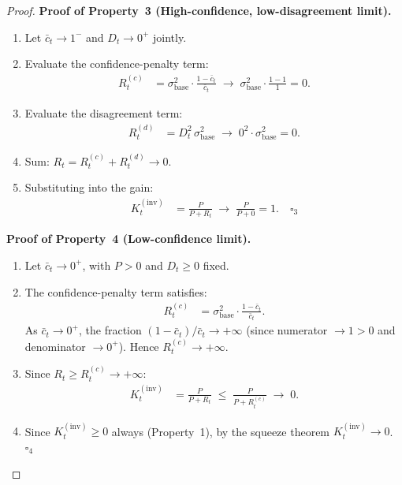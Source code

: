 \documentclass[12pt,openany]{book}
\numberwithin{equation}{chapter}
\theoremstyle{plain}
\theoremstyle{definition}
\theoremstyle{remark}
\begin{document}
\begin{proof}
\medskip
\noindent\textbf{Proof of Property~3
(High-confidence, low-disagreement limit).}
\begin{enumerate}
  \item Let $\bar{c}_t \to 1^{-}$ and $D_t \to 0^{+}$
        jointly.
  \item Evaluate the confidence-penalty term:
        \begin{align}
          R_t^{(c)}
          &= \sigma_{\mathrm{base}}^2 \cdot
             \frac{1 - \bar{c}_t}{\bar{c}_t}
          \;\to\;
          \sigma_{\mathrm{base}}^2 \cdot
          \frac{1 - 1}{1}
          = 0.
          \label{eq:proof3-Rc}
        \end{align}
  \item Evaluate the disagreement term:
        \begin{align}
          R_t^{(d)}
          &= D_t^2\,\sigma_{\mathrm{base}}^2
          \;\to\;
          0^2 \cdot \sigma_{\mathrm{base}}^2
          = 0.
          \label{eq:proof3-Rd}
        \end{align}
  \item Sum: $R_t = R_t^{(c)} + R_t^{(d)} \to 0$.
  \item Substituting into the gain:
        \begin{align}
          K_t^{(\mathrm{inv})}
          &= \frac{P}{P + R_t}
          \;\to\;
          \frac{P}{P + 0}
          = 1. \quad \square_3
          \label{eq:proof3-K}
        \end{align}
\end{enumerate}

\medskip
\noindent\textbf{Proof of Property~4
(Low-confidence limit).}
\begin{enumerate}
  \item Let $\bar{c}_t \to 0^{+}$, with $P > 0$
        and $D_t \geq 0$ fixed.
  \item The confidence-penalty term satisfies:
        \begin{align}
          R_t^{(c)}
          &= \sigma_{\mathrm{base}}^2 \cdot
             \frac{1 - \bar{c}_t}{\bar{c}_t}.
          \label{eq:proof4-Rc}
        \end{align}
        As $\bar{c}_t \to 0^{+}$, the fraction
        $(1 - \bar{c}_t)/\bar{c}_t \to +\infty$
        (since numerator $\to 1 > 0$ and denominator
        $\to 0^{+}$).
        Hence $R_t^{(c)} \to +\infty$.
  \item Since $R_t \geq R_t^{(c)} \to +\infty$:
        \begin{align}
          K_t^{(\mathrm{inv})}
          &= \frac{P}{P + R_t}
          \;\leq\;
          \frac{P}{P + R_t^{(c)}}
          \;\to\; 0.
          \label{eq:proof4-K}
        \end{align}
  \item Since $K_t^{(\mathrm{inv})} \geq 0$ always
        (Property~1), by the squeeze theorem
        $K_t^{(\mathrm{inv})} \to 0$. $\square_4$
\end{enumerate}


\end{proof}
\end{document}
